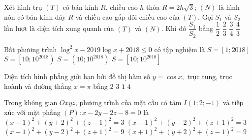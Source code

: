 \begin{ex}%
Xét hình trụ $(T)$ có bán kính $R$, chiều cao $h$ thỏa $R = 2h\sqrt 3$; $(N)$ là hình nón có bán kính đáy $R$ và chiều cao gấp đôi chiều cao của $(T).$ Gọi $S_1$ và $S_2$ lần lượt là diện tích xung quanh của $(T)$ và $(N)$. Khi đó $\dfrac{S_1}{S_2}$ bằng
\choice
	{\True$\dfrac{1}{2}$} 				
	{$\dfrac{2}{3}$} 			
	{$\dfrac{3}{4}$} 			
	{$\dfrac{4}{3}$}
\end{ex}
\begin{ex}%
Bất phương trình ${\log ^2}x - 2019\log x + 2018 \le 0$ có tập nghiệm là
\choice
{$S = \left[ {1;2018} \right]$}		
{$S = \left[ {10;{{10}^{2018}}} \right)$}	
{$S = \left( {10;{{10}^{2018}}} \right)$}	
{\True$S = \left[ {10;{{10}^{2018}}} \right]$} 
\end{ex}

\begin{ex}%
Diện tích hình phẳng giới hạn bởi đồ thị hàm số $y = \cos x,$ trục tung, trục hoành và đường thẳng $x = \pi $ bằng
\choice
	{\True$2$} 			
	{$3$} 			
	{$1$} 			
	{$4$}
\end{ex}

\begin{ex}%
Trong không gian $Oxyz$, phương trình của mặt cầu có tâm $I(1;2;-1)$ và tiếp xúc với mặt phẳng $(P) \colon x-2y-2z-8=0$ là
\choice 
{$(x+1)^2+(y+2)^2+(z-1)^2=3$}
{$(x-1)^2+(y-2)^2+(z+1)^2=3$}
{\True $(x-1)^2+(y-2)^2+(z+1)^2=9$}
{$(x+1)^2+(y+2)^2+(z-1)^2=9$}
\end{ex}

